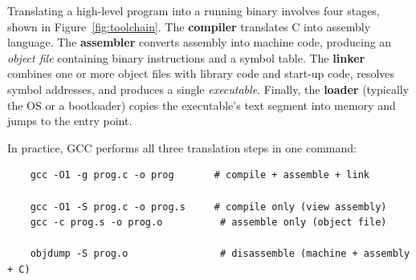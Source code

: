\documentclass[9pt, a4paper]{extarticle}
\begin{document}
Translating a high-level program into a running binary involves four stages, shown in Figure~\ref{fig:toolchain}. The \textbf{compiler} translates C into assembly language. The \textbf{assembler} converts assembly into machine code, producing an \emph{object file} containing binary instructions and a symbol table. The \textbf{linker} combines one or more object files with library code and start-up code, resolves symbol addresses, and produces a single \emph{executable}. Finally, the \textbf{loader} (typically the OS or a bootloader) copies the executable's text segment into memory and jumps to the entry point.

In practice, GCC performs all three translation steps in one command:

\begin{verbatim}
    gcc -O1 -g prog.c -o prog       # compile + assemble + link

    gcc -O1 -S prog.c -o prog.s     # compile only (view assembly)
    gcc -c prog.s -o prog.o          # assemble only (object file)

    objdump -S prog.o                # disassemble (machine + assembly + C)
\end{verbatim}
\end{document}
